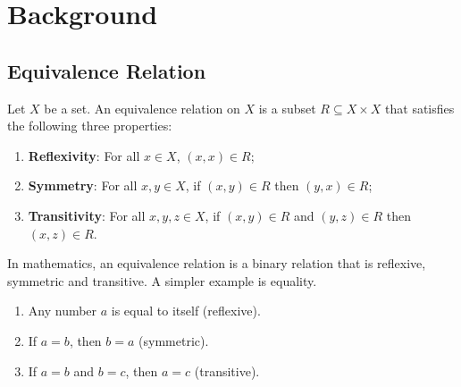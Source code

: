 
\chapter{Background}


\section{Equivalence Relation}


\begin{definition}
Let $X$ be a set. An equivalence relation on $X$ is a subset $R \subseteq X \times X$ that satisfies the following three properties:
\begin{enumerate}
    \item \textbf{Reflexivity}: For all $x \in X$, $(x,x) \in R$;
    \item \textbf{Symmetry}: For all $x, y \in X$, if $(x,y) \in R$ then $(y,x) \in R$;
    \item \textbf{Transitivity}: For all $x, y, z \in X$, if $(x,y) \in R$ and $(y,z) \in R$ then $(x,z) \in R$.
\end{enumerate}
\end{definition}

In mathematics, an equivalence relation is a binary relation that is reflexive, symmetric and transitive. A simpler example is equality. 

\begin{enumerate}
    \item Any number $a$ is equal to itself (reflexive).
    \item  If $a=b$, then $b=a$ (symmetric).
    \item If $a=b$ and $b=c$, then $a=c$ (transitive). 
\end{enumerate}

\subsection{}